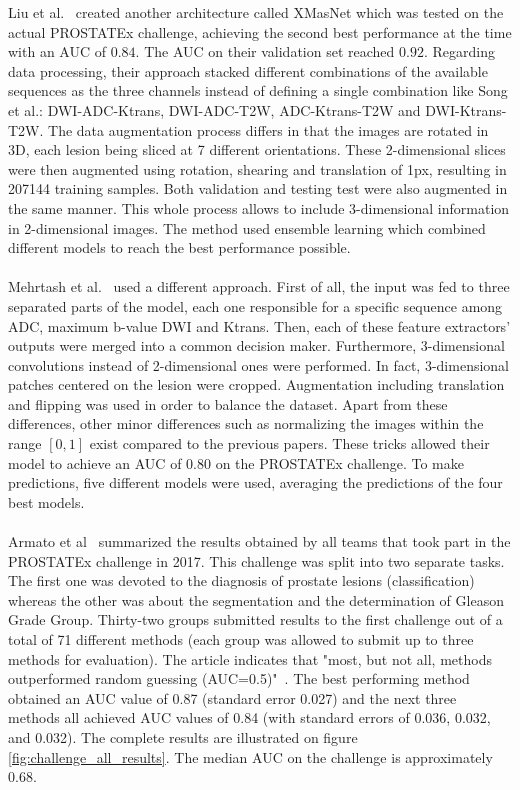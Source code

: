 Liu et al.~\cite{46} created another architecture called XMasNet which was tested on the actual PROSTATEx challenge, achieving the second best performance at the time with an AUC of $0.84$. The AUC on their validation set reached $0.92$. Regarding data processing, their approach stacked different combinations of the available sequences as the three channels instead of defining a single combination like Song et al.: DWI-ADC-Ktrans, DWI-ADC-T2W, ADC-Ktrans-T2W and DWI-Ktrans-T2W. The data augmentation process differs in that the images are rotated in 3D, each lesion being sliced at 7 different orientations. These 2-dimensional slices were then augmented using rotation, shearing and translation of 1px, resulting in 207144 training samples. Both validation and testing test were also augmented in the same manner. This whole process allows to include 3-dimensional information in 2-dimensional images. The method used ensemble learning which combined different models to reach the best performance possible.\\ \\
Mehrtash et al.~\cite{01} used a different approach. First of all, the input was fed to three separated parts of the model, each one responsible for a specific sequence among ADC, maximum b-value DWI and Ktrans. Then, each of these feature extractors' outputs were merged into a common decision maker. Furthermore, 3-dimensional convolutions instead of 2-dimensional ones were performed. In fact, 3-dimensional patches centered on the lesion were cropped. Augmentation including translation and flipping was used in order to balance the dataset. Apart from these differences, other minor differences such as normalizing the images within the range $[0,1]$ exist compared to the previous papers. These tricks allowed their model to achieve an AUC of $0.80$ on the PROSTATEx challenge. To make predictions, five different models were used, averaging the predictions of the four best models.\\ \\
Armato et al~\cite{42} summarized the results obtained by all teams that took part in the PROSTATEx challenge in 2017. This challenge was split into two separate tasks. The first one was devoted to the diagnosis of prostate lesions (classification) whereas the other was about the segmentation and the determination of Gleason Grade Group. Thirty-two groups submitted results to the first challenge out of a total of 71 different methods (each group was allowed to submit up to three methods for evaluation). The article indicates that "most, but not all, methods outperformed random guessing (AUC=0.5)"~\cite{41}. The best performing method obtained an AUC value of 0.87 (standard error 0.027) and the next three methods all achieved AUC values of 0.84 (with standard errors of 0.036, 0.032, and 0.032). The complete results are illustrated on figure \ref{fig:challenge_all_results}. The median AUC on the challenge is approximately $0.68$.

